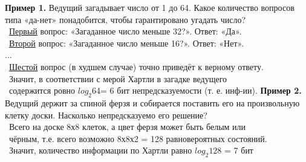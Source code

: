 \newpage
\rhead{\textbf{\textcolor{blue}{П}\textcolor{gray}{ример применения меры Хартли на практике}}}
\vspace*{2mm}
\newline
\textbf{Пример 1.} Ведущий загадывает число от 1 до 64. Какое количество вопросов типа
«да-нет» понадобится, чтобы гарантировано угадать число?\\
\quad{$\bullet$} \ \underline{Первый} вопрос: «Загаданное число меньше 32?». Ответ: «Да».\\
\quad{$\bullet$} \ \underline{Второй} вопрос: «Загаданное число меньше 16?». Ответ: «Нет».\\
\quad{$\bullet$} \qquad ... \\
\quad{$\bullet$} \ \underline{Шестой} вопрос (в худшем случае) точно приведёт к верному ответу.\\

\quad{$\bullet$} \  Значит, в соответствии с мерой Хартли в загадке ведущего\\
\quad \quad \ содержится ровно $log_2 64$= 6 бит непредсказуемости (т. е. инф-ии).
\newline
\textbf{Пример 2.} Ведущий держит за спиной ферзя и собирается поставить его 
на произвольную клетку доски. Насколько непредсказуемо его решение?\\
\quad{$\bullet$} \ Всего на доске 8х8 клеток, а цвет ферзя может быть белым или  \\
\quad \quad \ чёрным, т.е. всего возможно 8х8х2 = 128 равновероятных состояний.\\
\quad{$\bullet$} \ Значит, количество информации по Хартли равно $log_2 128$ = 7 бит \\



